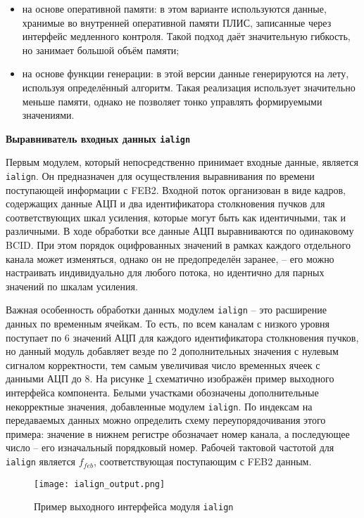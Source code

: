 \begin{itemize}
    \item на основе оперативной памяти: в этом варианте используются данные, хранимые во внутренней оперативной памяти ПЛИС, записанные через интерфейс медленного контроля. Такой подход даёт значительную гибкость, но занимает большой объём памяти;
    \item на основе функции генерации: в этой версии данные генерируются на лету, используя определённый алгоритм. Такая реализация использует значительно меньше памяти, однако не позволяет тонко управлять формируемыми значениями.
\end{itemize}\par
\textbf{Выравниватель входных данных \texttt{ialign}}\par
Первым модулем, который непосредственно принимает входные данные, является \texttt{ialign}. Он предназначен для осуществления выравнивания по времени поступающей информации с FEB2. Входной поток организован в виде кадров, содержащих данные АЦП и два идентификатора столкновения пучков для соответствующих шкал усиления, которые могут быть как идентичными, так и различными. В ходе обработки все данные АЦП выравниваются по одинаковому BCID. При этом порядок оцифрованных значений в рамках каждого отдельного канала может изменяться, однако он не предопределён заранее, -- его можно настраивать индивидуально для любого потока, но идентично для парных значений по шкалам усиления.\par
Важная особенность обработки данных модулем \texttt{ialign} -- это расширение данных по временным ячейкам. То есть, по всем каналам с низкого уровня поступает по 6 значений АЦП для каждого идентификатора столкновения пучков, но данный модуль добавляет везде по 2 дополнительных значения с нулевым сигналом корректности, тем самым увеличивая число временных ячеек с данными АЦП до 8. На рисунке \ref{fig:ialign_output} схематично изображён пример выходного интерфейса компонента. Белыми участками обозначены дополнительные некорректные значения, добавленные модулем \texttt{ialign}. По индексам на передаваемых данных можно определить схему переупорядочивания этого примера: значение в нижнем регистре обозначает номер канала, а последующее число -- его изначальный порядковый номер. Рабочей тактовой частотой для \texttt{ialign} является $f_{feb}$, соответствующая поступающим с FEB2 данным.

\begin{figure}[ht]
    \centering
    \texttt{[image: ialign\_output.png]}
    \caption{Пример выходного интерфейса модуля \texttt{ialign}}
    \label{fig:ialign_output}
\end{figure}\par

